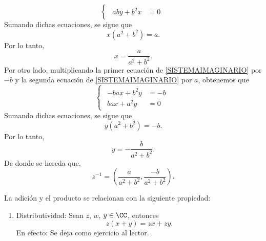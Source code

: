 \begin{enumerate}[resume,label=A\arabic*.]
\begin{enumerate}[label=\roman*.]
$$\begin{cases}
\begin{aligned}
                aby + b^2x & = 0
            \end{aligned}
        \end{cases}$$
        Sumando dichas ecuaciones, se sigue que
        $$x\left(a^2 + b^2\right) = a.$$
        Por lo tanto,
        $$x = \frac{a}{a^2 + b^2}.$$\newpage
        Por otro lado, multiplicando la primer ecuación de \eqref{SISTEMAIMAGINARIO} por $-b$ y la segunda ecuación de \eqref{SISTEMAIMAGINARIO} por $a$, obtenemos que
        $$\begin{cases}
            \begin{aligned}
                -bax + b^2y & = -b \\
                bax + a^2y & = 0
            \end{aligned}
        \end{cases}$$
        Sumando dichas ecuaciones, se sigue que
        $$y\left(a^2 + b^2\right) = -b.$$
        Por lo tanto,
        $$y = -\frac{b}{a^2 + b^2}.$$
        De donde se hereda que,
        $$z^{-1} = \left(\frac{a}{a^2 + b^2}, \frac{-b}{a^2 + b^2}\right).$$
    \end{enumerate}
\end{enumerate}
La adición y el producto se relacionan con la siguiente propiedad:
\begin{enumerate}[resume,label=A\arabic*.]
    \item Distributividad: Sean $z$, $w$, $y \in \CC$, entonces
    $$z(x + y) = zx + zy.$$
    En efecto: Se deja como ejercicio al lector.
\end{enumerate}

